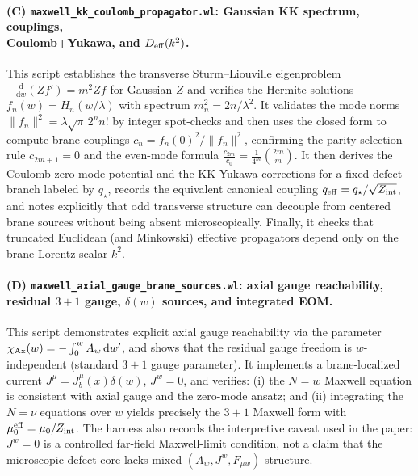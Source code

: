 \documentclass[11pt]{article}
\newcommand{\dd}{\mathrm d}
\newcommand{\A}{A}
\newcommand{\J}{J}
\newcommand{\Z}{Z}
\newcommand{\lam}{\lambda}      %
\newcommand{\Zint}{Z_{\rm int}} %
\newcommand{\qstar}{q_\star}
\newcommand{\qeff}{q_{\rm eff}}
\newcommand{\muo}{\mu_0}
\newcommand{\mueff}{\mu_0^{\rm eff}}
\begin{document}
\paragraph{(C) \texttt{maxwell\_kk\_coulomb\_propagator.wl}: Gaussian KK spectrum, couplings,\\Coulomb+Yukawa, and \(D_{\rm eff}(k^2)\).}
This script establishes the transverse Sturm--Liouville eigenproblem
\(-\frac{\dd}{\dd w}(\Z f')=m^2\Z f\) for Gaussian \(\Z\) and verifies the Hermite
solutions \(f_n(w)=H_n(w/\lam)\) with spectrum \(m_n^2=2n/\lam^2\). It validates the
mode norms \(\|f_n\|^2=\lam\sqrt{\pi}\,2^n n!\) by integer spot-checks and then
uses the closed form to compute brane couplings
\(c_n=f_n(0)^2/\|f_n\|^2\), confirming the parity selection rule \(c_{2m+1}=0\) and
the even-mode formula \(\frac{c_{2m}}{c_0}=\frac{1}{4^m}\binom{2m}{m}\). It then
derives the Coulomb zero-mode potential and the KK Yukawa corrections for a fixed
defect branch labeled by \(\qstar\), records the equivalent canonical coupling
\(\qeff=\qstar/\sqrt{\Zint}\), and notes explicitly that odd transverse structure
can decouple from centered brane sources without being absent microscopically.
Finally, it checks that truncated Euclidean (and Minkowski) effective propagators
depend only on the brane Lorentz scalar \(k^2\).

\paragraph{(D) \texttt{maxwell\_axial\_gauge\_brane\_sources.wl}: axial gauge reachability, residual \(3+1\) gauge, \(\delta(w)\) sources, and integrated EOM.}
This script demonstrates explicit axial gauge reachability via the parameter
\(\chi_{\rm Ax}(w)=-\int_0^w \A_w\,\dd w'\), and shows that the residual gauge
freedom is \(w\)-independent (standard \(3+1\) gauge parameter). It implements a
brane-localized current \(\J^\mu=\J_b^\mu(x)\delta(w)\), \(\J^w=0\), and verifies:
(i) the \(N=w\) Maxwell equation is consistent with axial gauge and the zero-mode
ansatz; and (ii) integrating the \(N=\nu\) equations over \(w\) yields precisely
the \(3+1\) Maxwell form with \(\mueff=\muo/\Zint\). The harness also records the
interpretive caveat used in the paper: \(\J^w=0\) is a controlled far-field
Maxwell-limit condition, not a claim that the microscopic defect core lacks mixed
\((A_w,J^w,F_{\mu w})\) structure.
\end{document}
